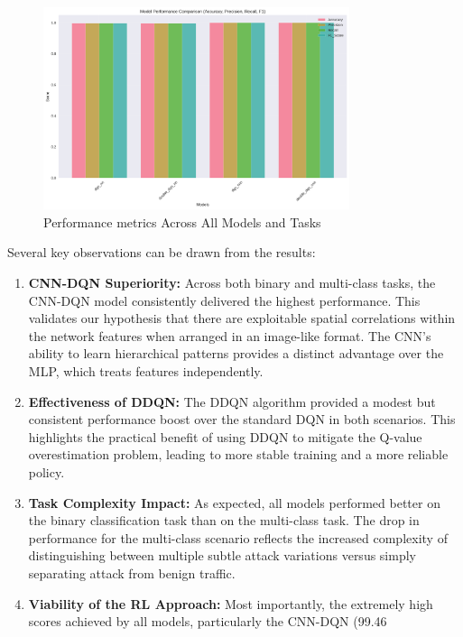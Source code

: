\documentclass[16pt]{report}
\begin{document}
\begin{figure}[H]
    \centering
    \includegraphics[width=0.8\textwidth]{images/performance_metrics_comparison.png} %
    \caption{Performance metrics Across All Models and Tasks}
    \label{fig:performance_metrics_comparison}
\end{figure}

Several key observations can be drawn from the results:
\begin{enumerate}
    \item \textbf{CNN-DQN Superiority:} Across both binary and multi-class tasks, the CNN-DQN model consistently delivered the highest performance. This validates our hypothesis that there are exploitable spatial correlations within the network features when arranged in an image-like format. The CNN's ability to learn hierarchical patterns provides a distinct advantage over the MLP, which treats features independently.
    \item \textbf{Effectiveness of DDQN:} The DDQN algorithm provided a modest but consistent performance boost over the standard DQN in both scenarios. This highlights the practical benefit of using DDQN to mitigate the Q-value overestimation problem, leading to more stable training and a more reliable policy.
    \item \textbf{Task Complexity Impact:} As expected, all models performed better on the binary classification task than on the multi-class task. The drop in performance for the multi-class scenario reflects the increased complexity of distinguishing between multiple subtle attack variations versus simply separating attack from benign traffic.
    \item \textbf{Viability of the RL Approach:} Most importantly, the extremely high scores achieved by all models, particularly the CNN-DQN (99.46%
\end{enumerate}
\end{document}
